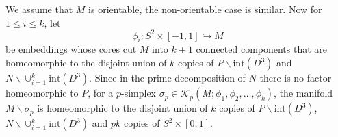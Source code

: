 \documentclass[a4paper]{amsart}
\theoremstyle{definition}
\theoremstyle{remark}
\numberwithin{equation}{section}
\begin{document}
We assume that $M$ is orientable, the non-orientable case is similar. Now for $1\leq i\leq k$, let 
\begin{equation}\label{spheres}\phi_i:S^2\times [-1,1]\hookrightarrow M\end{equation}
 be embeddings whose cores cut $M$ into $k+1$ connected components that are homeomorphic to the disjoint union of $k$ copies of $P\backslash \text{int}(D^3)$ and $N\backslash \cup_{i=1}^{k}\text{int}(D^3)$. Since in the prime decomposition of $N$ there is no factor homeomorphic to $P$, for a $p$-simplex $\sigma_p\in \mathcal{K}_p(M;\phi_1,\phi_2,\dots,\phi_k)$, the manifold $M\backslash \sigma_p$ is homeomorphic to the disjoint union of $k$ copies of $P\backslash \text{int}(D^3)$, $N\backslash  \cup_{i=1}^{k}\text{int}(D^3)$ and $pk$ copies of $S^2\times [0,1]$.
\end{document}
